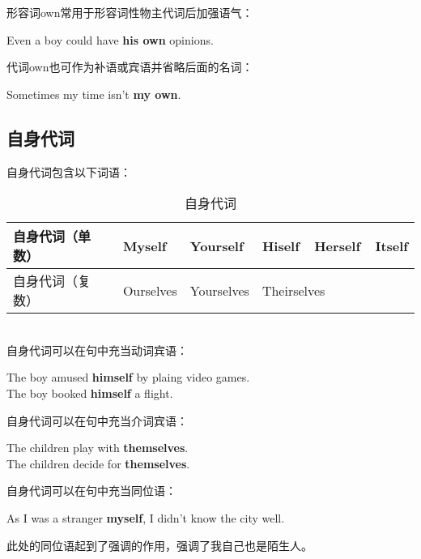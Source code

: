 \documentclass[UTF8]{ctexart}
\begin{document}
    形容词{\hspace{3pt}\ttfamily own}常用于形容词性物主代词后加强语气：
    \begin{center}
        \ttfamily\large
        Even a boy could have \textbf{his own} opinions.\\[6mm]
    \end{center}
    代词{\hspace{3pt}\ttfamily own}也可作为补语或宾语并省略后面的名词：
    \begin{center}
        \ttfamily\large
        Sometimes my time isn't \textbf{my own}.
    \end{center}

\newpage

\subsection{自身代词}   
    自身代词包含以下词语：
    \begin{table}[h]
        \begin{center}
            \ttfamily
            \begin{tabular}{p{85pt}|p{55pt}|p{60pt}|p{135pt}}
                \hline
                自身代词（单数）&Myself&Yourself&Hiself~~Herself~~Itself\\ \hline
                自身代词（复数）&Ourselves&Yourselves&Theirselves \\ \hline
            \end{tabular}
            \rmfamily
            \caption{自身代词}
        \end{center}
    \end{table}\\
    自身代词可以在句中充当动词宾语：
    \begin{center}
        \ttfamily\large
        The boy amused \textbf{himself} by plaing video games.\\[3mm]
        The boy booked \textbf{himself} a flight.\\[6mm]
    \end{center}
    自身代词可以在句中充当介词宾语：
    \begin{center}
        \ttfamily\large
        The children play with \textbf{themselves}.\\[3mm]
        The children decide for \textbf{themselves}.\\[6mm]
    \end{center}
    自身代词可以在句中充当同位语：
    \begin{center}
        \ttfamily\large
        As I was a stranger \textbf{myself}, I didn't know the city well.\\[6mm]
    \end{center}
    此处的同位语起到了强调的作用，强调了我自己也是陌生人。
\end{document}
